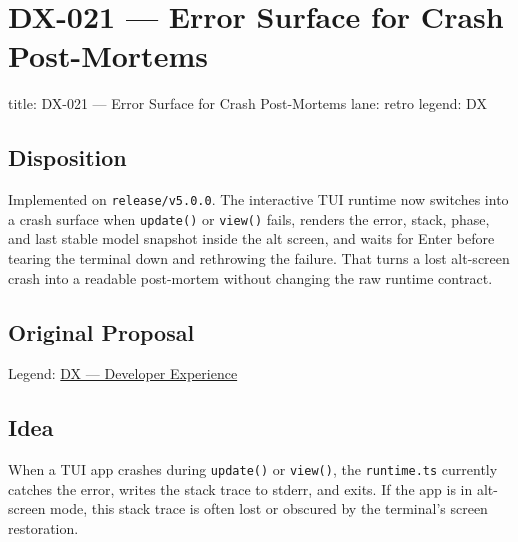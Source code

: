 \chapter{DX-021 --- Error Surface for Crash Post-Mortems}\label{record-333}

\smallskip

\begin{RecordMeta}
title: DX-021 — Error Surface for Crash Post-Mortems
lane: retro
legend: DX

\end{RecordMeta}

\section{Disposition}\label{record-333-disposition}

Implemented on \texttt{r\allowbreak{}e\allowbreak{}l\allowbreak{}e\allowbreak{}a\allowbreak{}s\allowbreak{}e\allowbreak{}/\allowbreak{}v\allowbreak{}5\allowbreak{}.\allowbreak{}0\allowbreak{}.\allowbreak{}0}. The interactive TUI runtime now switches into a crash surface when \texttt{u\allowbreak{}p\allowbreak{}d\allowbreak{}a\allowbreak{}t\allowbreak{}e\allowbreak{}(\allowbreak{})} or \texttt{v\allowbreak{}i\allowbreak{}e\allowbreak{}w\allowbreak{}(\allowbreak{})} fails, renders the error, stack, phase, and last stable model snapshot inside the alt screen, and waits for Enter before tearing the terminal down and rethrowing the failure. That turns a lost alt-screen crash into a readable post-mortem without changing the raw runtime contract.

\section{Original Proposal}\label{record-333-original-proposal}

Legend: \href{https://github.com/flyingrobots/bijou/blob/1853ad902f6bf219326409e7f743a5a1d6517dbc/docs/method/legends/DX-developer-experience.md}{DX --- Developer Experience}

\section{Idea}\label{record-333-idea}

When a TUI app crashes during \texttt{u\allowbreak{}p\allowbreak{}d\allowbreak{}a\allowbreak{}t\allowbreak{}e\allowbreak{}(\allowbreak{})} or \texttt{v\allowbreak{}i\allowbreak{}e\allowbreak{}w\allowbreak{}(\allowbreak{})}, the \texttt{r\allowbreak{}u\allowbreak{}n\allowbreak{}t\allowbreak{}i\allowbreak{}m\allowbreak{}e\allowbreak{}.\allowbreak{}t\allowbreak{}s} currently catches the error, writes the stack trace to stderr, and exits. If the app is in alt-screen mode, this stack trace is often lost or obscured by the terminal's screen restoration.


